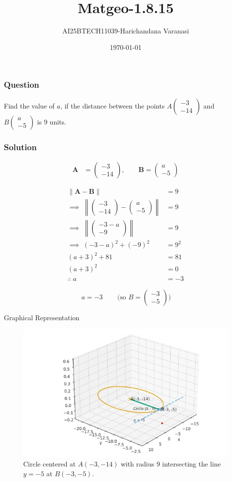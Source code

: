 \documentclass{beamer}
\title{Matgeo-1.8.15}
\author{AI25BTECH11039-Harichandana Varanasi}
\date{\today}
\theoremstyle{remark}
\newcommand{\myvec}[1]{\ensuremath{\begin{pmatrix}#1\end{pmatrix}}}
\let\vec\mathbf
\begin{document}
\begin{frame}
\titlepage
\end{frame}


\begin{frame}
\frametitle{Question}
\question
Find the value of $a$, if the distance between the points 
$A\myvec{-3\\-14}$ and $B\myvec{a\\-5}$ is $9$ units.

\end{frame}
%
\begin{frame}
\frametitle{Solution}

\begin{align}
\vec{A} &= \myvec{-3\\-14}, \qquad
\vec{B} = \myvec{a\\-5}
\end{align}

\begin{align}
\|\vec{A}-\vec{B}\| &= 9 \\[2mm]
\implies \;\left\|\myvec{-3\\-14}-\myvec{a\\-5}\right\|
&= 9 \\[1mm]
\implies \;\left\|\myvec{-3-a\\-9}\right\|
&= 9 \\[1mm]
\implies \;(-3-a)^2 + (-9)^2 &= 9^2 \\[1mm]
(a+3)^2 + 81 &= 81 \\[1mm]
(a+3)^2 &= 0 \\[1mm]
\therefore\; a &= -3
\end{align}

\[
\boxed{\,a=-3\,}\qquad\text{(so }B=\myvec{-3\\-5}\text{)}
\]
\end{frame}

\begin{frame}{Graphical Representation}
   \begin{figure}[h!]
\centering
\includegraphics[width=0.7\linewidth]{figs/matgeo-1.8.15.jpeg}
\caption{Circle centered at $A(-3,-14)$ with radius $9$ intersecting the line $y=-5$ at $B(-3,-5)$.}

\end{figure} 

\end{frame}
\end{document}

